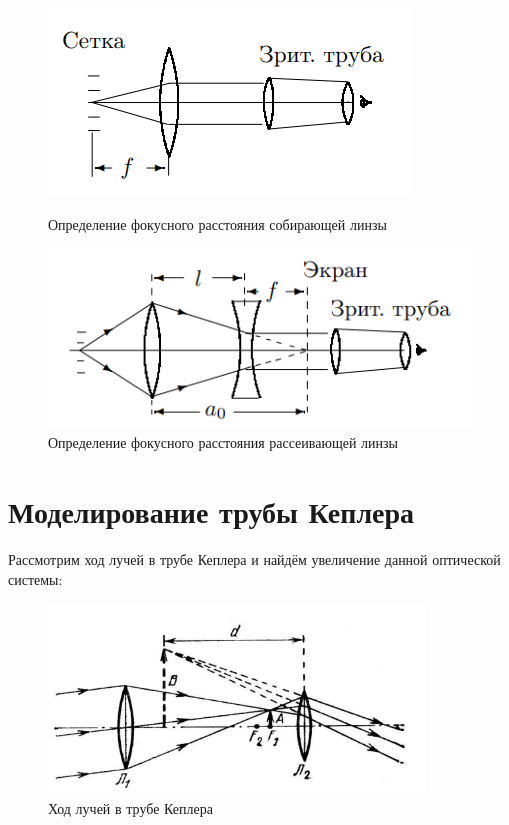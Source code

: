 \begin{figure}[h!]
    \begin{center}
        \begin{minipage}[h!]{0.60\linewidth}
            \includegraphics[width=1\linewidth]{pics/plus_lens.png}
            \caption{Определение фокусного расстояния собирающей линзы} %
        \label{} 
        \end{minipage}

        \hfill 

        \begin{minipage}[h!]{0.60\linewidth}
            \includegraphics[width=1\linewidth]{pics/minus_lens.png}
            \caption{Определение фокусного расстояния рассеивающей линзы}
        \label{}
    \end{minipage}
    \end{center}
\end{figure}

\section{Моделирование трубы Кеплера}

Рассмотрим ход лучей в трубе Кеплера и найдём увеличение данной оптической системы:
    
\begin{figure}[h!]
    \centering
        \includegraphics[width=10cm]{pics/kepler.png}
    \caption{Ход лучей в трубе Кеплера}
    \label{}
\end{figure}

